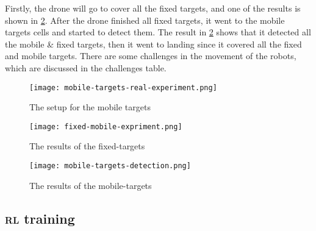 \documentclass[../main.tex]{subfiles}
\begin{document}
Firstly, the drone will go to cover all the fixed targets, and one of the 
results is shown in \cref{fig:fixed-mobile-expriment}. After the 
drone finished all fixed targets, it went to the mobile targets cells and
started to detect them. The result in \cref{fig:fixed-mobile-expriment} 
shows that it detected all the mobile \& fixed targets, 
then it went to landing since it covered all the fixed and mobile targets.
There are some challenges in the movement of the robots, which are 
discussed in the challenges table.


\begin{figure}[H]
	\centering
	\texttt{[image: mobile-targets-real-experiment.png]}
	\caption{The setup for the mobile targets}
	\label{fig:mobile-targets-real-experiment}
\end{figure}

\begin{figure}[H]
	\centering
	\texttt{[image: fixed-mobile-expriment.png]}
	\caption{The results of the fixed-targets}
	\label{fig:fixed-mobile-expriment}
\end{figure}

\begin{figure}[H]
	\centering
	\texttt{[image: mobile-targets-detection.png]}
	\caption{The results of the mobile-targets}
	\label{fig:mobile-expriment-detection}
\end{figure}

\subsection{\textsc{rl} training}
\end{document}
